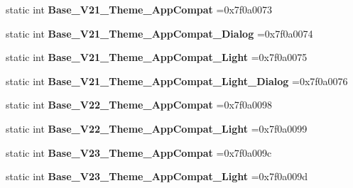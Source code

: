 \begin{DoxyCompactItemize}
static int {\bfseries Base\+\_\+\+V21\+\_\+\+Theme\+\_\+\+App\+Compat} =0x7f0a0073
\item 
\mbox{\label{classandroid_1_1support_1_1v7_1_1appcompat_1_1R_1_1style_af8743dea02f535185433c26657dc83b1}} 
static int {\bfseries Base\+\_\+\+V21\+\_\+\+Theme\+\_\+\+App\+Compat\+\_\+\+Dialog} =0x7f0a0074
\item 
\mbox{\label{classandroid_1_1support_1_1v7_1_1appcompat_1_1R_1_1style_abc99d96a1f22ba00c746d5c04cab3388}} 
static int {\bfseries Base\+\_\+\+V21\+\_\+\+Theme\+\_\+\+App\+Compat\+\_\+\+Light} =0x7f0a0075
\item 
\mbox{\label{classandroid_1_1support_1_1v7_1_1appcompat_1_1R_1_1style_a12ea1eaf12a21be21ecfc49591d7b7fd}} 
static int {\bfseries Base\+\_\+\+V21\+\_\+\+Theme\+\_\+\+App\+Compat\+\_\+\+Light\+\_\+\+Dialog} =0x7f0a0076
\item 
\mbox{\label{classandroid_1_1support_1_1v7_1_1appcompat_1_1R_1_1style_a54d64a22074652e6ea4870bcbb7993d0}} 
static int {\bfseries Base\+\_\+\+V22\+\_\+\+Theme\+\_\+\+App\+Compat} =0x7f0a0098
\item 
\mbox{\label{classandroid_1_1support_1_1v7_1_1appcompat_1_1R_1_1style_a3d3f268eae28bc0bced2fdd489d1ab2c}} 
static int {\bfseries Base\+\_\+\+V22\+\_\+\+Theme\+\_\+\+App\+Compat\+\_\+\+Light} =0x7f0a0099
\item 
\mbox{\label{classandroid_1_1support_1_1v7_1_1appcompat_1_1R_1_1style_a671d8d56bf53aafe2cfc2a2d690fb843}} 
static int {\bfseries Base\+\_\+\+V23\+\_\+\+Theme\+\_\+\+App\+Compat} =0x7f0a009c
\item 
\mbox{\label{classandroid_1_1support_1_1v7_1_1appcompat_1_1R_1_1style_ae615d46ca386ea5440aa65aec2ddffb4}} 
static int {\bfseries Base\+\_\+\+V23\+\_\+\+Theme\+\_\+\+App\+Compat\+\_\+\+Light} =0x7f0a009d
\item 
\mbox{\label{classandroid_1_1support_1_1v7_1_1appcompat_1_1R_1_1style_a42479b50276174bb8e599aa25a868c03}} 

\end{DoxyCompactItemize}
